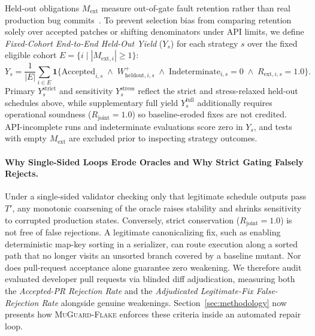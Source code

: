 Held-out obligations $M_{\text{ext}}$ measure out-of-gate fault retention rather than real production bug commits~\cite{just2014mutants}. To prevent selection bias from comparing retention solely over accepted patches or shifting denominators under API limits, we define \emph{Fixed-Cohort End-to-End Held-Out Yield} ($Y_s$) for each strategy $s$ over the fixed eligible cohort $E = \{ i \mid |M_{\text{ext}, i}| \ge 1 \}$:
\begin{equation}
\label{eq:ys}
Y_s = \frac{1}{|E|} \sum_{i \in E} \mathbf{1}\Big\{ \text{Accepted}_{i, s} \;\land\; W^+_{\text{heldout}, i, s} \;\land\; \text{Indeterminate}_{i, s} = 0 \;\land\; R_{\text{ext}, i, s} = 1.0 \Big\}.
\end{equation}
Primary $Y_s^{\text{strict}}$ and sensitivity $Y_s^{\text{stress}}$ reflect the strict and stress-relaxed held-out schedules above, while supplementary full yield $Y_s^{\text{full}}$ additionally requires operational soundness ($R_{\text{joint}} = 1.0$) so baseline-eroded fixes are not credited. API-incomplete runs and indeterminate evaluations score zero in $Y_s$, and tests with empty $M_{\text{ext}}$ are excluded prior to inspecting strategy outcomes.

\paragraph{Why Single-Sided Loops Erode Oracles and Why Strict Gating Falsely Rejects.}
Under a single-sided validator checking only that legitimate schedule outputs pass $T'$, any monotonic coarsening of the oracle raises stability and shrinks sensitivity to corrupted production states. Conversely, strict conservation ($R_{\text{joint}} = 1.0$) is not free of false rejections. A legitimate canonicalizing fix, such as enabling deterministic map-key sorting in a serializer, can route execution along a sorted path that no longer visits an unsorted branch covered by a baseline mutant. Nor does pull-request acceptance alone guarantee zero weakening. We therefore audit evaluated developer pull requests via blinded diff adjudication, measuring both the \emph{Accepted-PR Rejection Rate} and the \emph{Adjudicated Legitimate-Fix False-Rejection Rate} alongside genuine weakenings. Section~\ref{sec:methodology} now presents how \textsc{MuGuard-Flake} enforces these criteria inside an automated repair loop.
